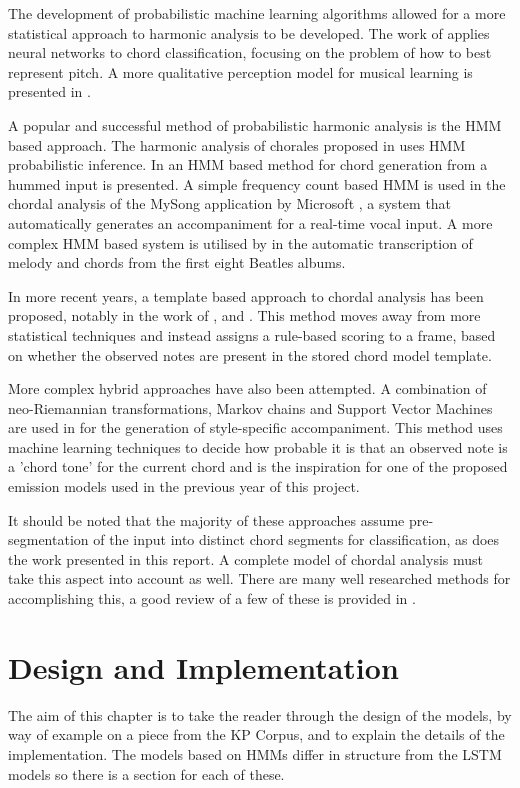 \documentclass[bsc,singlespacing,logo, parskip, deptreport]{infthesis}
\begin{document}
The development of probabilistic machine learning algorithms allowed for a more statistical approach to harmonic analysis to be developed. The work of \cite{laden1989representation} applies neural networks to chord classification, focusing on the problem of how to best represent pitch. A more qualitative perception model for musical learning is presented in \cite{widmer1992qualitative}.

A popular and successful method of probabilistic harmonic analysis is the HMM based approach. The harmonic analysis of chorales proposed in \cite{allan2005harmonising} uses HMM probabilistic inference. In \cite{lee2004ring} an HMM based method for chord generation from a hummed input is presented. A simple frequency count based HMM is used in the chordal analysis of the MySong application by Microsoft \cite[]{mysong}, a system that automatically generates an accompaniment for a real-time vocal input. A more complex HMM based system is utilised by \cite{ryynanen2008automatic} in the automatic transcription of melody and chords from the first eight Beatles albums.

In more recent years, a template based approach to chordal analysis has been proposed, notably in the work of \cite{pardo2002algorithms}, \cite{oudre2009template} and \cite{oudre2011probabilistic}. This method moves away from more statistical techniques and instead assigns a rule-based scoring to a frame, based on whether the observed notes are present in the stored chord model template.

More complex hybrid approaches have also been attempted. A combination of neo-Riemannian transformations, Markov chains and Support Vector Machines are used in \cite{chuan2007hybrid} for the generation of style-specific accompaniment. This method uses machine learning techniques to decide how probable it is that an observed note is a 'chord tone' for the current chord and is the inspiration for one of the proposed emission models used in the previous year of this project.

It should be noted that the majority of these approaches assume pre-segmentation of the input into distinct chord segments for classification, as does the work presented in this report. A complete model of chordal analysis must take this aspect into account as well. There are many well researched methods for accomplishing this, a good review of a few of these is provided in \cite{pardo2002algorithms}.

\chapter{Design and Implementation}
The aim of this chapter is to take the reader through the design of the models, by way of example on a piece from the KP Corpus, and to explain the details of the implementation. The models based on HMMs differ in structure from the LSTM models so there is a section for each of these.
\end{document}

